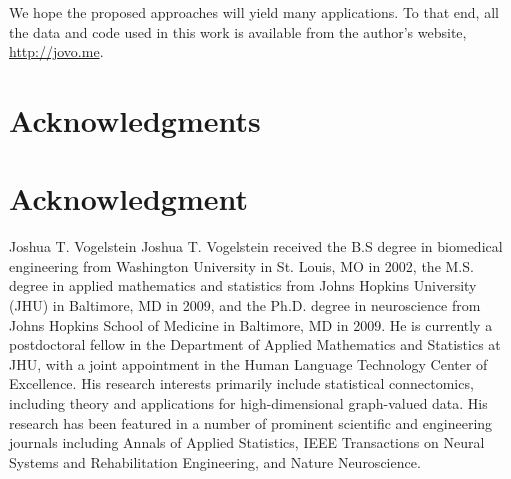 \documentclass[10pt,journal,cspaper,compsoc]{IEEEtran}
\begin{document}
We hope the proposed approaches will yield many applications.  To that end, all the data and code used in this work is available from the author's website, \url{http://jovo.me}.  

% 
% 
% 


% 

\ifCLASSOPTIONcompsoc
  \section*{Acknowledgments}
\else
  \section*{Acknowledgment}
\fi


\ifCLASSOPTIONcaptionsoff
  \newpage
\fi





\begin{IEEEbiography}{Joshua T. Vogelstein}
Joshua T. Vogelstein received the B.S degree in biomedical engineering from Washington University in St. Louis, MO in 2002, the M.S. degree in applied mathematics and statistics from Johns Hopkins University (JHU) in Baltimore, MD in 2009, and the Ph.D. degree in neuroscience from Johns Hopkins School of Medicine in Baltimore, MD in 2009.  He is currently a postdoctoral fellow in the Department of Applied Mathematics and Statistics at JHU, with a joint appointment in the Human Language Technology Center of Excellence.  His research interests primarily include statistical connectomics, including theory and applications for high-dimensional graph-valued data. His research has been featured in a number of prominent scientific and engineering journals including Annals of Applied Statistics, IEEE Transactions on Neural Systems and Rehabilitation Engineering, and Nature Neuroscience.

\end{IEEEbiography}
\end{document}
